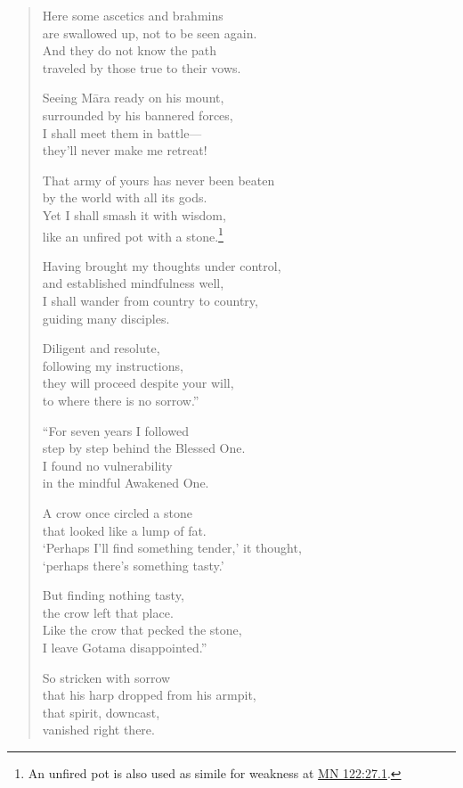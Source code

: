 \documentclass[12pt,openany]{book}%
\begin{document}
\begin{verse}
Here some ascetics and brahmins \\
are swallowed up, not to be seen again. \\
And they do not know the path \\
traveled by those true to their vows. 

Seeing \textsanskrit{Māra} ready on his mount, \\
surrounded by his bannered forces, \\
I shall meet them in battle—\\
they’ll never make me retreat! 

That army of yours has never been beaten \\
by the world with all its gods. \\
Yet I shall smash it with wisdom, \\
like an unfired pot with a stone.\footnote{An unfired pot is also used as simile for weakness at \href{https://suttacentral.net/mn122/en/sujato\#27.1}{MN 122:27.1}. } 

Having brought my thoughts under control, \\
and established mindfulness well, \\
I shall wander from country to country, \\
guiding many disciples. 

Diligent and resolute, \\
following my instructions, \\
they will proceed despite your will, \\
to where there is no sorrow.” 

“For seven years I followed \\
step by step behind the Blessed One. \\
I found no vulnerability \\
in the mindful Awakened One. 

A crow once circled a stone \\
that looked like a lump of fat. \\
‘Perhaps I’ll find something tender,’ it thought, \\
‘perhaps there’s something tasty.’ 

But finding nothing tasty, \\
the crow left that place. \\
Like the crow that pecked the stone, \\
I leave Gotama disappointed.” 

So stricken with sorrow \\
that his harp dropped from his armpit, \\
that spirit, downcast, \\
vanished right there. 

%
\end{verse}
\end{document}
